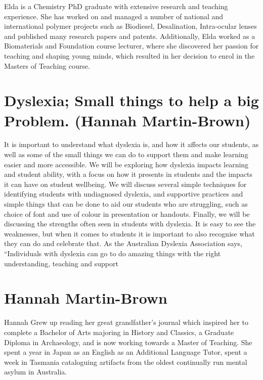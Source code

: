 \documentclass[twoside,14pt,a4paper,notitlepage]{memoir}
\begin{document}
Elda is a Chemistry PhD graduate with extensive research and teaching experience. She has worked on and managed a number of national and international polymer projects such as Biodiesel, Desalination, Intra-ocular lenses and published many research papers and patents. Additionally, Elda worked as a Biomaterials and Foundation course lecturer, where she discovered her passion for teaching and shaping young minds, which resulted in her decision to enrol in the Masters of Teaching course.



\section*{Dyslexia; Small things to help a big Problem. (Hannah Martin-Brown)}
\label{aut:brown}

It is important to understand what dyslexia is, and how it affects our students, as well as some of the small things we can do to support them and make learning easier and more accessible.
We will be exploring how dyslexia impacts learning and student ability, with a focus on how it presents in students and the impacts it can have on student wellbeing. We will discuss several simple techniques for identifying students with undiagnosed dyslexia, and supportive practices and simple things that can be done to aid our students who are struggling, such as choice of font and use of colour in presentation or handouts.
Finally, we will be discussing the strengths often seen in students with dyslexia. It is easy to see the weaknesses, but when it comes to students it is important to also recognise what they can do and celebrate that. As the Australian Dyslexia Association says, “Individuals with dyslexia can go to do amazing things with the right understanding, teaching and support

\section*{Hannah Martin-Brown}

Hannah Grew up reading her great grandfather’s journal which inspired her to complete a Bachelor of Arts majoring in History and Classics, a Graduate Diploma in Archaeology, and is now working towards a Master of Teaching. She spent a year in Japan as an English as an Additional Language Tutor, spent a week in Tasmania cataloguing artifacts from the oldest continually run mental asylum in Australia.
\end{document}
